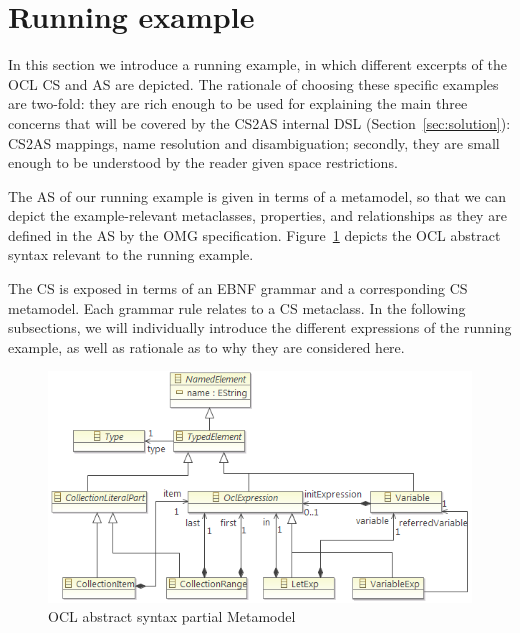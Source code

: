\documentclass{llncs}
\begin{document}

\section{Running example}
\label{sec:example}

In this section we introduce a running example, in which different excerpts of the OCL CS and AS are depicted. The rationale of choosing these specific examples are two-fold: they are rich enough to be used for explaining the main three concerns that will be covered by the CS2AS internal DSL (Section~\ref{sec:solution}): CS2AS mappings, name resolution and disambiguation; secondly, they are small enough to be understood by the reader given space restrictions.

The AS of our running example is given in terms of a metamodel, so that we can depict the example-relevant metaclasses, properties, and relationships as they are defined in the AS by the OMG specification. Figure~\ref{fig:exampleAS} depicts the OCL abstract syntax relevant to the running example. 

The CS is exposed in terms of an EBNF grammar and a corresponding CS metamodel. Each grammar rule relates to a CS metaclass. In the following subsections, we will individually introduce the different expressions of the running example, as well as rationale as to why they are considered here.

\begin{figure}[htbp]
\centering
\includegraphics[scale=0.75]{images/RunningaExampleAS.png}
\caption{OCL abstract syntax partial Metamodel}
\label{fig:exampleAS}
\end{figure}
\end{document}
